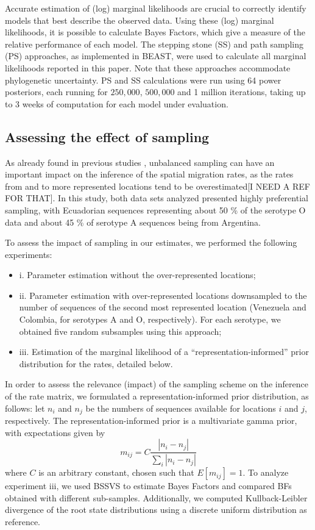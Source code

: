 \documentclass[10pt]{article}
\begin{document}
Accurate estimation of (log) marginal likelihoods are crucial to correctly identify models that best describe the observed data. 
Using these (log) marginal likelihoods, it is possible to calculate Bayes Factors, which give a measure of the relative performance of each model. 
The stepping stone (SS) and path sampling (PS) approaches, as implemented in BEAST, were used  to calculate all marginal likelihoods reported in this paper.
Note that these approaches accommodate phylogenetic uncertainty.
PS and SS calculations were run using 64 power posteriors, each running for $250,000$, $500,000$ and 1 million iterations, taking up to 3 weeks of computation for each model under evaluation.

\subsection*{Assessing the effect of sampling}

As already found in previous studies \cite{Faria2012, Lemey2013}, unbalanced sampling can have an important impact on the inference of the spatial migration rates, as the rates from and to more represented locations tend to be overestimated[I NEED A REF FOR THAT].
In this study, both data sets analyzed presented highly preferential sampling, with Ecuadorian sequences representing about 50 \% of the serotype O data and about 45 \% of serotype A sequences being from Argentina.

To assess the impact of sampling in our estimates, we performed the following experiments:
\begin{itemize}
 \item i. Parameter estimation without the over-represented locations;
 \item ii. Parameter estimation with over-represented locations downsampled to the number of sequences of the second most represented location (Venezuela and Colombia, for serotypes A and O, respectively). For each serotype, we obtained five random subsamples using this approach;
 \item iii. Estimation of the marginal likelihood of a ``representation-informed'' prior distribution for the rates, detailed below.
\end{itemize}

In order to assess the relevance (impact) of the sampling scheme on the inference of the rate matrix, we formulated a representation-informed prior distribution, as follows: let $n_i$ and $n_j$ be the numbers of sequences available for locations $i$ and $j$, respectively.
 The representation-informed prior is a multivariate gamma prior, with expectations given by
\begin{equation}
 m_{ij}=C\frac{|n_i-n_j|}{\sum_i|n_i-n_j|}
\end{equation}
where $C$ is an arbitrary constant, chosen such that $E[m_{ij}]=1$.
To analyze experiment iii, we used BSSVS to estimate Bayes Factors and compared BFs obtained with different sub-samples.
Additionally, we computed Kullback-Leibler divergence \cite{KL,roots} of the root state distributions using a discrete uniform distribution as reference. 
\end{document}
